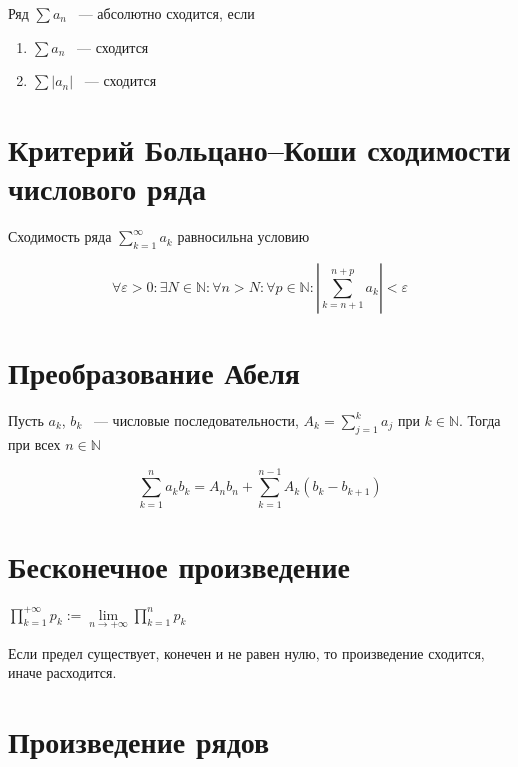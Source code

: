 \documentclass{article}
\begin{document}
        Ряд $\sum a_n$ ~--- абсолютно сходится, если
        
        \begin{enumerate}
        
            \item $\sum a_n$ ~--- сходится
            
            \item $\sum |a_n|$ ~--- сходится
            
        \end{enumerate}
        
    \newpage
    
    \section{Критерий Больцано--Коши сходимости числового ряда}
    
        Сходимость ряда $\sum\limits_{k = 1}^{\infty} a_k$ равносильна условию
        
        $$\forall \varepsilon > 0 : \exists N \in \mathbb{N} : \forall n > N : \forall p \in \mathbb{N} : \left| \sum\limits_{k = n+1}^{n + p} a_k \right| < \varepsilon$$
        
    \newpage
    
    \section{Преобразование Абеля}
    
        Пусть $a_k$, $b_k$ ~--- числовые последовательности, $A_k = \sum\limits_{j = 1}^k a_j$ при $k \in \mathbb{N}$. Тогда при всех $n \in \mathbb{N}$
        
        $$\sum\limits_{k = 1}^n a_k b_k = A_n b_n+ \sum\limits^{n - 1}_{k = 1} A_k(b_k - b_{k + 1})$$
        
    \newpage
    
    \section{Бесконечное произведение}
    
        $\prod\limits^{+\infty}_{k = 1} p_k := \lim\limits_{n \rightarrow +\infty} \prod\limits^n_{k = 1} p_k$
        
        Если предел существует, конечен и не равен нулю, то произведение сходится, иначе расходится.
    
    \newpage
    
    \section{Произведение рядов}
    
\end{document}
